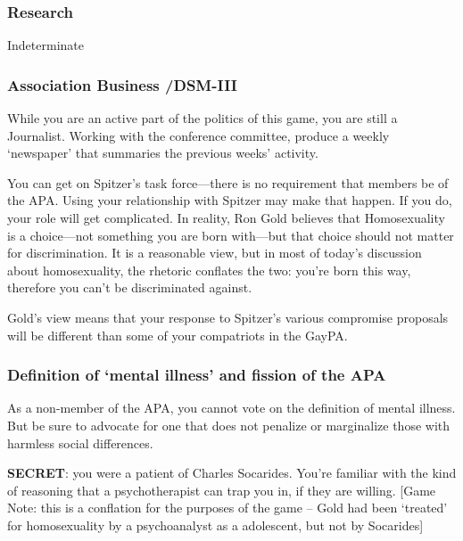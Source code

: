 \begin{refsection}
\subsubsection{Research}
\label{research}

Indeterminate

\subsubsection{Association Business \slash  DSM-III}
\label{associationbusinessdsm-iii}

\begin{writingtask}[Gold]\label{writingtask:goldB}
While you are an active part of the politics of this game, you are still a Journalist.  Working with the conference committee, produce a weekly ‘newspaper’ that summaries the previous weeks’ activity.
\end{writingtask}

You can get on Spitzer’s task force---there is no requirement that members be of the APA. Using your relationship with Spitzer may make that happen. If you do, your role will get complicated. In reality, Ron Gold believes that Homosexuality is a choice---not something you are born with---but that choice should not matter for discrimination. It is a reasonable view, but in most of today’s discussion about homosexuality, the rhetoric conflates the two: you’re born this way, therefore you can’t be discriminated against. 

Gold’s view means that your response to Spitzer’s various compromise proposals will be different than some of your compatriots in the GayPA.

\subsubsection{Definition of ‘mental illness’ and fission of the APA}
\label{definitionof‘mentalillness’andfissionoftheapa}

As a non-member of the APA, you cannot vote on the definition of mental illness. But be sure to advocate for one that does not penalize or marginalize those with harmless social differences.

\textbf{SECRET}: you were a patient of Charles Socarides. You're familiar with the kind of reasoning that a psychotherapist can trap you in, if they are willing. [Game Note: this is a conflation for the purposes of the game – Gold had been ‘treated’ for homosexuality by a psychoanalyst as a adolescent, but not by Socarides]


\end{refsection}
